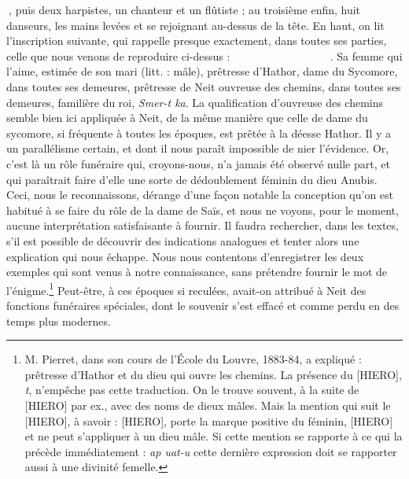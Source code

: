 \documentclass[a4paper, 11pt, oneside]{article}
\newcommand*\hieroglyhicsAAAH{}
\newcommand*\hieroglyhicsAAAO{}
\newcommand*\hieroglyhicsAAAX{}
\newcommand*\hieroglyhicsAABC{\raisebox{0.5ex}{}}
\newcommand*\hieroglyhicsAABR{}
\newcommand*\hieroglyhicsAACB{\raisebox{0.5ex}{}}
\newcommand*\hieroglyhicsAACM{}
\newcommand*\hieroglyhicsAACS{}
\newcommand*\hieroglyhicsAAEK{}
\newcommand*\hieroglyhicsAAFS{}
\newcommand*\hieroglyhicsAAHC{}
\newcommand*\hieroglyhicsAAHY{}
\newcommand*\hieroglyhicsAALJ{}
\newcommand*\hieroglyhicsAAOR{}
\newcommand*\hieroglyhicsAAQA{}
\newcommand*\hieroglyhicsAAQP{}
\newcommand*\hieroglyhicsAARM{}
\newcommand*\hieroglyhicsAASG{}
\newcommand*\hieroglyhicsAASK{}
\newcommand*\hieroglyhicsAASM{}
\newcommand*\hieroglyhicsAASN{}
\newcommand*\hieroglyhicsAASQ{}
\newcommand*\hieroglyhicsAAST{}
\newcommand*\hieroglyhicsAASU{}
\newcommand*\hieroglyhicsAASV{}
\newcommand*\hieroglyhicsAASW{}
\newcommand*\hieroglyhicsAASX{}
\newcommand*\hieroglyhicsAASY{}
\newcommand*\hieroglyhicsAASZ{}
\newcommand*\hieroglyhicsAATA{}
\newcommand*\hieroglyhicsAATB{}
\begin{document}
$\hieroglyhicsAAOR\:\hieroglyhicsAAST$, puis deux harpistes, un chanteur et un flûtiste ; au troisième enfin, huit danseurs, les mains levées et se rejoignant au-dessus de la tête. En haut, on lit l'inscription suivante, qui rappelle presque exactement, dans toutes ses parties, celle que nous venons de reproduire ci-dessus : $\hieroglyhicsAASK\:\hieroglyhicsAASU\:\hieroglyhicsAASV\allowbreak\:\hieroglyhicsAAAH\:\hieroglyhicsAAQA\:\hieroglyhicsAASW\:\hieroglyhicsAACM\:\hieroglyhicsAACB\:\hieroglyhicsAALJ\allowbreak\:\hieroglyhicsAASM\:\hieroglyhicsAACS\:\hieroglyhicsAARM\:\hieroglyhicsAAEK\:\hieroglyhicsAAHC\:\hieroglyhicsAABC\allowbreak\:\hieroglyhicsAASN\:\hieroglyhicsAAQP\:\hieroglyhicsAABR\:\hieroglyhicsAAHY\:\hieroglyhicsAAHY\:\hieroglyhicsAAHY\allowbreak\:\hieroglyhicsAACS\:\hieroglyhicsAAFS\:\hieroglyhicsAASX\:\hieroglyhicsAAAO\:\hieroglyhicsAAEK\:\hieroglyhicsAAHC\allowbreak\:\hieroglyhicsAASY\:\hieroglyhicsAASQ\:\hieroglyhicsAABR\:\hieroglyhicsAAHY\:\hieroglyhicsAAHY\:\hieroglyhicsAAHY\allowbreak\:\hieroglyhicsAAFS\:\hieroglyhicsAAAX\:\hieroglyhicsAASZ\:\hieroglyhicsAACS\:\hieroglyhicsAATA\allowbreak\:\hieroglyhicsAASG\:\hieroglyhicsAATB$. Sa femme qui l'aime, estimée de son mari (litt. : mâle), prêtresse d'Hathor, dame du Sycomore, dans toutes ses demeures, prêtresse de Neit ouvreuse des chemins, dans toutes ses demeures, familière du roi, \emph{Smer-t ka}. La qualification d'ouvreuse des chemins semble bien ici appliquée à Neit, de la même manière que celle de dame du sycomore, si fréquente à toutes les époques, est prêtée à la déesse Hathor. Il y a un parallélisme certain, et dont il nous paraît impossible de nier l'évidence. Or, c'est là un rôle funéraire qui, croyons-nous, n'a jamais été observé nulle part, et qui paraîtrait faire d'elle une sorte de dédoublement féminin du dieu Anubis. Ceci, nous le reconnaissons, dérange d'une façon notable la conception qu'on est habitué à se faire du rôle de la dame de Saïs, et nous ne voyons, pour le moment, aucune interprétation satisfaisante à fournir. Il faudra rechercher, dans les textes, s'il est possible de découvrir des indications analogues et tenter alors une explication qui nous échappe. Nous nous contentons d'enregistrer les deux exemples qui sont venus à notre connaissance, sans prétendre fournir le mot de l'énigme.\footnote{M. Pierret, dans son cours de l'École du Louvre, 1883-84, a expliqué : prêtresse d'Hathor et du dieu qui ouvre les chemins. La présence du [HIERO], \emph{t}, n'empêche pas cette traduction. On le trouve souvent, à la suite de [HIERO] par ex., avec des noms de dieux mâles. Mais la mention qui suit le [HIERO], à savoir : [HIERO], porte la marque positive du féminin, [HIERO] et ne peut s'appliquer à un dieu mâle. Si cette mention se rapporte à ce qui la précède immédiatement : \emph{ap uat-u} cette dernière expression doit se rapporter aussi à une divinité femelle.} Peut-être, à ces époques si reculées, avait-on attribué à Neit des fonctions funéraires spéciales, dont le souvenir s'est effacé et comme perdu en des temps plus modernes.
\end{document}
